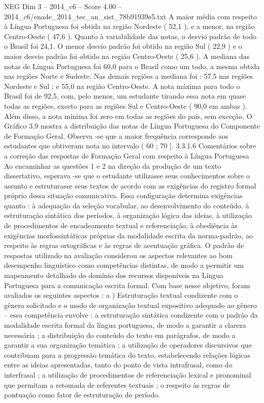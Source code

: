 \begin{textsample}{NEG Dim 3 – 2014\_c6 – Score 4.00 – 2014\_c6/enade\_2014\_tec\_an\_sist\_78b91939e5.txt}
A maior média com respeito à Língua Portuguesa foi obtida na região Nordeste ( 52,1 ), e a menor, na região Centro-Oeste ( 47,6 ).
Quanto à variabilidade das notas, o desvio padrão de todo o Brasil foi 24,1.
O menor desvio padrão foi obtido na região Sul ( 22,9 ) e o maior desvio padrão foi obtido na região Centro-Oeste ( 25,6 ).
A mediana das notas de Língua Portuguesa foi 60,0 para o Brasil como um todo, a mesma obtida nas regiões Norte e Sudeste.
Nas demais regiões a mediana foi : 57,5 nas regiões Nordeste e Sul ; e 55,0 na região Centro-Oeste.
A nota máxima para todo o Brasil foi de 92,5, com, pelo menos, um estudante tirando essa nota em quase todas as regiões, exceto para as regiões Sul e Centro-Oeste ( 90,0 em ambas ).
Além disso, a nota mínima foi zero em todas as regiões do país, sem exceção.
O Gráfico 3.9 mostra a distribuição das notas de Língua Portuguesa do Componente de Formação Geral.
Observa -se que a maior frequência corresponde aos estudantes que obtiveram nota no intervalo ( 60 ; 70 ]. 3.3.1.6 Comentários sobre a correção das respostas de Formação Geral com respeito à Língua Portuguesa Ao encaminhar as questões 1 e 2 na direção da produção de um texto dissertativo, esperava -se que o estudante utilizasse seus conhecimentos sobre o assunto e estruturasse seus textos de acordo com as exigências do registro formal próprio dessa situação comunicativa.
Essa configuração determina exigências quanto : à adequação da seleção vocabular, ao desenvolvimento do conteúdo, à estruturação sintática dos períodos, à organização lógica das ideias, à utilização de procedimentos de encadeamento textual e referenciação, à obediência às exigências morfossintáticas próprias da modalidade escrita da norma-padrão, ao respeito às regras ortográficas e às regras de acentuação gráfica.
O padrão de respostas utilizado na avaliação considerou os aspectos relevantes ao bom desempenho linguístico como competências distintas, de modo a permitir um mapeamento detalhado do domínio dos recursos disponíveis na Língua Portuguesa para a comunicação escrita formal.
Com base nesse objetivo, foram avaliados os seguintes aspectos : a ) Estruturação textual condizente com o gênero solicitado e o modo de organização textual expositivo adequado ao gênero – essa competência envolve : a estruturação sintática condizente com o padrão da modalidade escrita formal da língua portuguesa, de modo a garantir a clareza necessária ; a distribuição do conteúdo do texto em parágrafos, de modo a garantir a sua organização temática ; a utilização de operadores discursivos que contribuam para a progressão temática do texto, estabelecendo relações lógicas entre as ideias apresentadas, tanto do ponto de vista intrafrasal, como do interfrasal ; a utilização de procedimentos de referenciação lexical e pronominal que permitam a retomada de referentes textuais ; o respeito às regras de pontuação como fator de estruturação do período.

\end{textsample}
